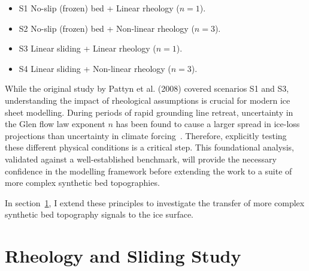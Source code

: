 \begin{itemize}
\item{S1} No-slip (frozen) bed + Linear rheology ($n=1$).
\item{S2} No-slip (frozen) bed + Non-linear rheology ($n=3$).
\item{S3} Linear sliding + Linear rheology ($n=1$).
\item{S4} Linear sliding + Non-linear rheology ($n=3$).
\end{itemize}

While the original study by Pattyn et al. (2008) covered scenarios S1 and S3, understanding the impact of rheological assumptions is crucial for modern ice sheet modelling. During periods of rapid grounding line retreat, uncertainty in the Glen flow law exponent $n$ has been found to cause a larger spread in ice-loss projections than uncertainty in climate forcing~\cite{Getraer_2025}. Therefore, explicitly testing these different physical conditions is a critical step. This foundational analysis, validated against a well-established benchmark, will provide the necessary confidence in the modelling framework before extending the work to a suite of more complex synthetic bed topographies.




In section~\ref{study1}, I extend these principles to investigate the transfer of more complex synthetic bed topography signals to the ice surface. 

\section{Rheology and Sliding Study}\label{study1}



